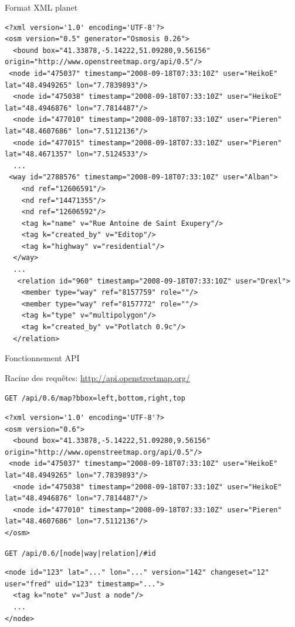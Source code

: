 \begin{frame}[fragile]{Format XML planet}
\tiny
\begin{verbatim}
<?xml version='1.0' encoding='UTF-8'?>
<osm version="0.5" generator="Osmosis 0.26">
  <bound box="41.33878,-5.14222,51.09280,9.56156" origin="http://www.openstreetmap.org/api/0.5"/>
 <node id="475037" timestamp="2008-09-18T07:33:10Z" user="HeikoE" lat="48.4949265" lon="7.7839893"/>
  <node id="475038" timestamp="2008-09-18T07:33:10Z" user="HeikoE" lat="48.4946876" lon="7.7814487"/>
  <node id="477010" timestamp="2008-09-18T07:33:10Z" user="Pieren" lat="48.4607686" lon="7.5112136"/>
  <node id="477015" timestamp="2008-09-18T07:33:10Z" user="Pieren" lat="48.4671357" lon="7.5124533"/>
  ...
 <way id="2788576" timestamp="2008-09-18T07:33:10Z" user="Alban">
    <nd ref="12606591"/>
    <nd ref="14471355"/>
    <nd ref="12606592"/>
    <tag k="name" v="Rue Antoine de Saint Exupery"/>
    <tag k="created_by" v="Editop"/>
    <tag k="highway" v="residential"/>
  </way>
  ...
   <relation id="960" timestamp="2008-09-18T07:33:10Z" user="Drexl">
    <member type="way" ref="8157759" role=""/>
    <member type="way" ref="8157772" role=""/>
    <tag k="type" v="multipolygon"/>
    <tag k="created_by" v="Potlatch 0.9c"/>
  </relation>
\end{verbatim}
\end{frame}



\begin{frame}[fragile]{Fonctionnement API} \vfill

Racine des requêtes: \url{http://api.openstreetmap.org/} \bigskip

\texttt{GET /api/0.6/map?bbox={\color{purple}left},{\color{purple}bottom},{\color{purple}right},{\color{purple}top}}

{\tiny
\begin{verbatim}
<?xml version='1.0' encoding='UTF-8'?>
<osm version="0.6">
  <bound box="41.33878,-5.14222,51.09280,9.56156" origin="http://www.openstreetmap.org/api/0.5"/>
 <node id="475037" timestamp="2008-09-18T07:33:10Z" user="HeikoE" lat="48.4949265" lon="7.7839893"/>
  <node id="475038" timestamp="2008-09-18T07:33:10Z" user="HeikoE" lat="48.4946876" lon="7.7814487"/>
  <node id="477010" timestamp="2008-09-18T07:33:10Z" user="Pieren" lat="48.4607686" lon="7.5112136"/>
</osm>
\end{verbatim}
}
\bigskip

\texttt{GET /api/0.6/[{\color{purple}node|way|relation}]/\#id}

{\tiny
\begin{verbatim}
<node id="123" lat="..." lon="..." version="142" changeset="12" user="fred" uid="123" timestamp="...">
  <tag k="note" v="Just a node"/>
  ...
</node>
\end{verbatim}
}

\end{frame}


